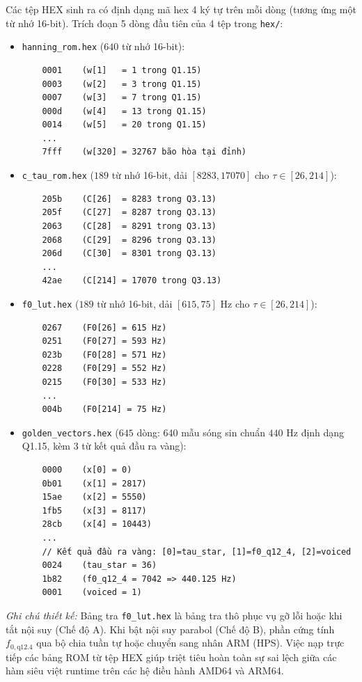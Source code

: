 \documentclass[11pt,a4paper]{article}
\begin{document}
Các tệp HEX sinh ra có định dạng mã hex 4 ký tự trên mỗi dòng (tương ứng một từ nhớ 16-bit). Trích đoạn 5 dòng đầu tiên của 4 tệp trong \texttt{hex/}:
\begin{itemize}
    \setlength{\itemsep}{1pt}
    \item \texttt{hanning\_rom.hex} ($640$ từ nhớ 16-bit):
    \begin{verbatim}
    0001    (w[1]   = 1 trong Q1.15)
    0003    (w[2]   = 3 trong Q1.15)
    0007    (w[3]   = 7 trong Q1.15)
    000d    (w[4]   = 13 trong Q1.15)
    0014    (w[5]   = 20 trong Q1.15)
    ...
    7fff    (w[320] = 32767 bão hòa tại đỉnh)
    \end{verbatim}
    \item \texttt{c\_tau\_rom.hex} ($189$ từ nhớ 16-bit, dải $[8283, 17070]$ cho $\tau \in [26, 214]$):
    \begin{verbatim}
    205b    (C[26]  = 8283 trong Q3.13)
    205f    (C[27]  = 8287 trong Q3.13)
    2063    (C[28]  = 8291 trong Q3.13)
    2068    (C[29]  = 8296 trong Q3.13)
    206d    (C[30]  = 8301 trong Q3.13)
    ...
    42ae    (C[214] = 17070 trong Q3.13)
    \end{verbatim}
    \item \texttt{f0\_lut.hex} ($189$ từ nhớ 16-bit, dải $[615, 75]\text{ Hz}$ cho $\tau \in [26, 214]$):
    \begin{verbatim}
    0267    (F0[26] = 615 Hz)
    0251    (F0[27] = 593 Hz)
    023b    (F0[28] = 571 Hz)
    0228    (F0[29] = 552 Hz)
    0215    (F0[30] = 533 Hz)
    ...
    004b    (F0[214] = 75 Hz)
    \end{verbatim}
    \item \texttt{golden\_vectors.hex} ($645$ dòng: 640 mẫu sóng sin chuẩn $440\text{ Hz}$ định dạng Q1.15, kèm 3 từ kết quả đầu ra vàng):
    \begin{verbatim}
    0000    (x[0] = 0)
    0b01    (x[1] = 2817)
    15ae    (x[2] = 5550)
    1fb5    (x[3] = 8117)
    28cb    (x[4] = 10443)
    ...
    // Kết quả đầu ra vàng: [0]=tau_star, [1]=f0_q12_4, [2]=voiced
    0024    (tau_star = 36)
    1b82    (f0_q12_4 = 7042 => 440.125 Hz)
    0001    (voiced = 1)
    \end{verbatim}
\end{itemize}

\textit{Ghi chú thiết kế:} Bảng tra \texttt{f0\_lut.hex} là bảng tra thô phục vụ gỡ lỗi hoặc khi tắt nội suy (Chế độ A). Khi bật nội suy parabol (Chế độ B), phần cứng tính $f_{0,\text{q12.4}}$ qua bộ chia tuần tự hoặc chuyển sang nhân ARM (HPS). Việc nạp trực tiếp các bảng ROM từ tệp HEX giúp triệt tiêu hoàn toàn sự sai lệch giữa các hàm siêu việt runtime trên các hệ điều hành AMD64 và ARM64.
\end{document}
